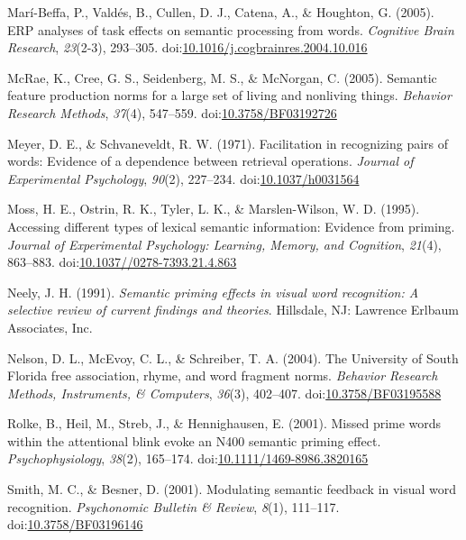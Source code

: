 \documentclass[english,man]{apa6}
\theoremstyle{definition}
\theoremstyle{definition}
\theoremstyle{definition}
\theoremstyle{remark}
\begin{document}
\hypertarget{ref-Mari-Beffa2005}{}
Marí-Beffa, P., Valdés, B., Cullen, D. J., Catena, A., \& Houghton, G.
(2005). ERP analyses of task effects on semantic processing from words.
\emph{Cognitive Brain Research}, \emph{23}(2-3), 293--305.
doi:\href{https://doi.org/10.1016/j.cogbrainres.2004.10.016}{10.1016/j.cogbrainres.2004.10.016}

\hypertarget{ref-McRae2005}{}
McRae, K., Cree, G. S., Seidenberg, M. S., \& McNorgan, C. (2005).
Semantic feature production norms for a large set of living and
nonliving things. \emph{Behavior Research Methods}, \emph{37}(4),
547--559.
doi:\href{https://doi.org/10.3758/BF03192726}{10.3758/BF03192726}

\hypertarget{ref-Meyer1971}{}
Meyer, D. E., \& Schvaneveldt, R. W. (1971). Facilitation in recognizing
pairs of words: Evidence of a dependence between retrieval operations.
\emph{Journal of Experimental Psychology}, \emph{90}(2), 227--234.
doi:\href{https://doi.org/10.1037/h0031564}{10.1037/h0031564}

\hypertarget{ref-Moss1995}{}
Moss, H. E., Ostrin, R. K., Tyler, L. K., \& Marslen-Wilson, W. D.
(1995). Accessing different types of lexical semantic information:
Evidence from priming. \emph{Journal of Experimental Psychology:
Learning, Memory, and Cognition}, \emph{21}(4), 863--883.
doi:\href{https://doi.org/10.1037//0278-7393.21.4.863}{10.1037//0278-7393.21.4.863}

\hypertarget{ref-Neely1991}{}
Neely, J. H. (1991). \emph{Semantic priming effects in visual word
recognition: A selective review of current findings and theories}.
Hillsdale, NJ: Lawrence Erlbaum Associates, Inc.

\hypertarget{ref-Nelson2004}{}
Nelson, D. L., McEvoy, C. L., \& Schreiber, T. A. (2004). The University
of South Florida free association, rhyme, and word fragment norms.
\emph{Behavior Research Methods, Instruments, \& Computers},
\emph{36}(3), 402--407.
doi:\href{https://doi.org/10.3758/BF03195588}{10.3758/BF03195588}

\hypertarget{ref-Rolke2001}{}
Rolke, B., Heil, M., Streb, J., \& Hennighausen, E. (2001). Missed prime
words within the attentional blink evoke an N400 semantic priming
effect. \emph{Psychophysiology}, \emph{38}(2), 165--174.
doi:\href{https://doi.org/10.1111/1469-8986.3820165}{10.1111/1469-8986.3820165}

\hypertarget{ref-Smith2001}{}
Smith, M. C., \& Besner, D. (2001). Modulating semantic feedback in
visual word recognition. \emph{Psychonomic Bulletin \& Review},
\emph{8}(1), 111--117.
doi:\href{https://doi.org/10.3758/BF03196146}{10.3758/BF03196146}
\end{document}
